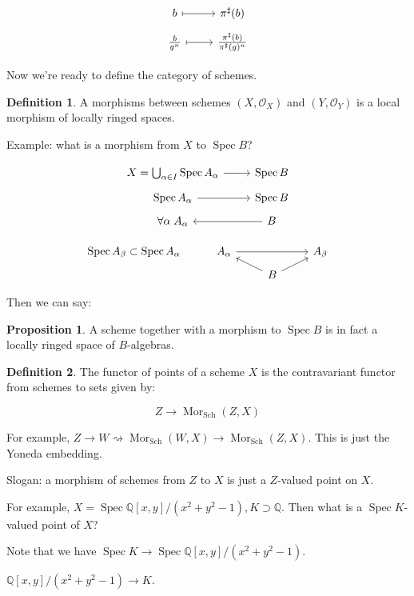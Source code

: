 \documentclass{article}
\theoremstyle{definition}
\newtheorem*{definition}{Definition}
\newtheorem{proposition}[theorem]{Proposition}
\begin{document}
    \[
        \begin{tikzcd}[row sep = tiny]
            b \ar[r,mapsto] & \pi^\sharp(b) \\
            \frac{b}{g^n} \ar[r,mapsto] & \frac{\pi^\sharp(b)}{\pi^{\sharp}(g)^n}
        \end{tikzcd}
    \]

    Now we're ready to define the category of schemes.

    \begin{definition}
        A morphisms between schemes \((X, \mathcal{O}_X)\) and \((Y, \mathcal{O}_Y)\) is a local morphism of locally ringed spaces.
    \end{definition}

    Example: what is a morphism from \(X\) to \(\operatorname{Spec} B\)?

    \[
        \begin{tikzcd}[row sep = tiny]
            X = \bigcup_{\alpha \in I} \operatorname{Spec} A_\alpha \ar[r] & \operatorname{Spec} B \\ \operatorname{Spec} A_\alpha \ar[r] & \operatorname{Spec} B \\ \forall \alpha \; A_\alpha & B \ar[l]
        \end{tikzcd}
    \]

    \[
        \begin{tikzcd}[row sep = tiny]
            \operatorname{Spec} A_\beta  \subset \operatorname{Spec} A_\alpha & A_\alpha \ar[rr] & & A_\beta \\ & &  B \ar[ru] \ar[lu]
        \end{tikzcd}
    \]

    Then we can say:

    \begin{proposition}
        A scheme together with a morphism to \(\operatorname{Spec} B\) is in fact a locally ringed space of \(B\)-algebras.
    \end{proposition}

    \begin{definition}
        The functor of points of a scheme \(X\) is the contravariant functor from schemes to sets given by:

        \[
            Z \to \operatorname{Mor}_{\text{Sch}} (Z, X)
        \]

        For example, \(Z \to W \rightsquigarrow \operatorname{Mor}_{\text{Sch}}(W,X) \to \operatorname{Mor}_{\text{Sch}}(Z,X)\). This is just the Yoneda embedding. 
    \end{definition}

    Slogan: a morphism of schemes from \(Z\) to \(X\) is just a \(Z\)-valued point on \(X\).

    For example, \(X = \operatorname{Spec} \mathbb{Q} [x,y] / (x^2 + y^2 - 1), K \supset \mathbb{Q}\). Then what is a \(\operatorname{Spec} K\)-valued point of \(X\)?

    Note that we have \(\operatorname{Spec} K \to \operatorname{Spec} \mathbb{Q} [x,y] / (x^2 + y^2 - 1)\).
    
    \(\mathbb{Q} [x,y] / (x^2 + y^2 - 1) \to K\).
\end{document}
